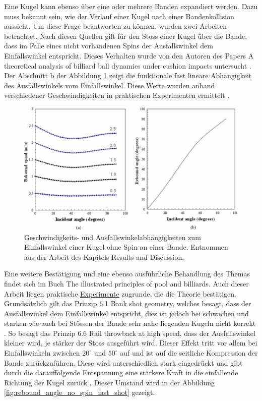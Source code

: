 Eine Kugel kann ebenso über eine oder mehrere Banden expandiert werden. Dazu muss bekannt sein, wie der Verlauf einer
Kugel nach einer Bandenkollision aussieht. Um diese Frage beantworten zu können, wurden zwei Arbeiten betrachtet.
Nach diesen Quellen gilt für den Stoss einer Kugel über die Bande, dass im Falle eines nicht vorhandenen Spins
der Ausfallswinkel dem Einfallswinkel entspricht. Dieses Verhalten wurde von den Autoren des Papers \glqq A theoretical analysis of billiard ball dynamics under cushion impacts\grqq{}
untersucht \cite{10.1243/09544062JMES1964}.
Der Abschnitt \glqq b\grqq{} der Abbildung \ref{fig:rail_rebound_angle_no_spin} zeigt die
funktionale fast lineare Abhängigkeit des Ausfallswinkels vom Einfallswinkel.
Diese Werte wurden anhand verschiedener Geschwindigkeiten in praktischen Experimenten ermittelt \cite{10.1243/09544062JMES1964}.

\begin{figure}[h!]
    \begin{center}
        \includegraphics[width=0.5\linewidth]{../common/03_billiard_ai/resources/55_rail_rebound_angle_no_spin.png}
    \end{center}
    \caption{Geschwindigkeits- und Ausfallswinkelabhängigkeiten zum Einfallswinkel einer Kugel ohne Spin an einer Bande.
    Entnommen aus der Arbeit \cite{10.1243/09544062JMES1964} des Kapitels \glqq Results and Discussion\grqq. }
    \label{fig:rail_rebound_angle_no_spin}
\end{figure}

\newpage
Eine weitere Bestätigung und eine ebenso ausführliche Behandlung des Themas findet sich im Buch \glqq The illustrated principles
of pool and billiards\grqq. Auch dieser Arbeit liegen praktische
\href{https://billiards.colostate.edu/high-speed-video/}{Experimente} zugrunde, die die Theorie bestätigen.
Grundsätzlich gilt das Prinzip 6.1 \glqq Bank shot geometry\grqq, welches besagt, dass
der Ausfallswinkel dem Einfallswinkel entspricht, dies ist
jedoch bei schwachen und starken wie auch bei Stössen der Bande sehr nahe liegenden Kugeln nicht korrekt \cite{book:the_ilustrated_principles_of_pool_and_billiards}.
So besagt das Prinzip 6.6 \glqq Rail throwback at high speed\grqq, dass der Ausfallswinkel kleiner wird, je stärker der Stoss ausgeführt wird.
Dieser Effekt tritt vor allem bei Einfallswinkeln zwischen $20^{\circ}$ und $50^{\circ}$ auf und ist auf
die seitliche Kompression der Bande zurückzuführen. Diese wird unterschiedlich stark eingedrückt und gibt durch die
darauffolgende Entspannung eine stärkere Kraft in die einfallende Richtung der Kugel zurück \cite{book:the_ilustrated_principles_of_pool_and_billiards}.
Dieser Umstand wird in der Abbildung \ref{fig:rebound_angle_no_spin_fast_shot} gezeigt.

